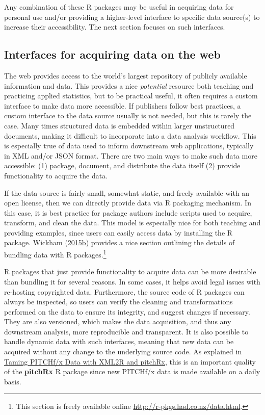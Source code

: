 \documentclass[12pt,]{isuthesis}
\let\rmarkdownfootnote\footnote%
\def\footnote{\protect\rmarkdownfootnote}
\begin{document}
Any combination of these R packages may be useful in acquiring data for
personal use and/or providing a higher-level interface to specific data
source(s) to increase their accessibility. The next section focuses on
such interfaces.

\subsection{Interfaces for acquiring data on the
web}\label{interfaces-for-acquiring-data-on-the-web}

The web provides access to the world's largest repository of publicly
available information and data. This provides a nice \emph{potential}
resource both teaching and practicing applied statistics, but to be
practical useful, it often requires a custom interface to make data more
accessible. If publishers follow best practices, a custom interface to
the data source usually is not needed, but this is rarely the case. Many
times structured data is embedded within larger unstructured documents,
making it difficult to incorporate into a data analysis workflow. This
is especially true of data used to inform downstream web applications,
typically in XML and/or JSON format. There are two main ways to make
such data more accessible: (1) package, document, and distribute the
data itself (2) provide functionality to acquire the data.

If the data source is fairly small, somewhat static, and freely
available with an open license, then we can directly provide data via R
packaging mechanism. In this case, it is best practice for package
authors include scripts used to acquire, transform, and clean the data.
This model is especially nice for both teaching and providing examples,
since users can easily access data by installing the R package. Wickham
(\protect\hyperlink{ref-rpkgs}{2015}\protect\hyperlink{ref-rpkgs}{b})
provides a nice section outlining the details of bundling data with R
packages.\footnote{This section is freely available online
  \url{http://r-pkgs.had.co.nz/data.html}.}

R packages that just provide functionality to acquire data can be more
desirable than bundling it for several reasons. In some cases, it helps
avoid legal issues with re-hosting copyrighted data. Furthermore, the
source code of R packages can always be inspected, so users can verify
the cleaning and transformations performed on the data to ensure its
integrity, and suggest changes if necessary. They are also versioned,
which makes the data acquisition, and thus any downstream analysis, more
reproducible and transparent. It is also possible to handle dynamic data
with such interfaces, meaning that new data can be acquired without any
change to the underlying source code. As explained in
\protect\hyperlink{taming-pitchfx-data-with-xml2r-and-pitchrx}{Taming
PITCHf/x Data with XML2R and pitchRx}, this is an important quality of
the \textbf{pitchRx} R package since new PITCHf/x data is made available
on a daily basis.
\end{document}

